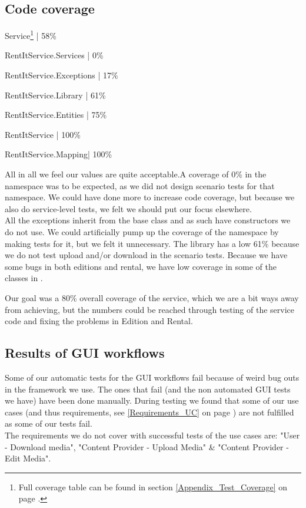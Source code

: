 \subsection{Code coverage}
\label{Testing_Results_Coverage}
\begin{my_itemize}
	\item Service\footnote{Full coverage table can be found in section \ref{Appendix_Test_Coverage} on page \pageref{Appendix_Test_Coverage}.} | 58\%
	\begin{my_itemize}
	\item RentItService.Services | 0\%
	\item RentItService.Exceptions | 17\%
	\item RentItService.Library | 61\%
	\item RentItService.Entities | 75\%
	\item RentItService | 100\%
	\item RentItService.Mapping| 100\%
	\end{my_itemize}
\end{my_itemize}

All in all we feel our values are quite acceptable.A coverage of 0\% in the  namespace was to be expected, as we did not design scenario tests for that namespace. We could have done more to increase code coverage, but because we also do service-level tests, we felt we should put our focus elsewhere.
\\ All the exceptions inherit from the base  class and as such have constructors we do not use. We could artificially pump up the coverage of the  namespace by making tests for it, but we felt it unnecessary. The library has a low 61\% because we do not test upload and/or download in the scenario tests. Because we have some bugs in both editions and rental, we have low coverage in some of the classes in .

Our goal was a 80\% overall coverage of the service, which we are a bit ways away from achieving, but the numbers could be reached through testing of the service code and fixing the problems in Edition and Rental.
\subsection{Results of GUI workflows}
\label{Testing_Results_Workflows}
Some of our automatic tests for the GUI workflows fail because of weird bug outs in the framework we use. The ones that fail (and the non automated GUI tests we have) have been done manually. During testing we found that some of our use cases (and thus requirements, see \ref{Requirements_UC} on page \pageref{Requirements_UC}) are not fulfilled as some of our tests fail. \\The requirements we do not cover with successful tests of the use cases are: "User - Download media", "Content Provider - Upload Media" \&  "Content Provider - Edit Media".
